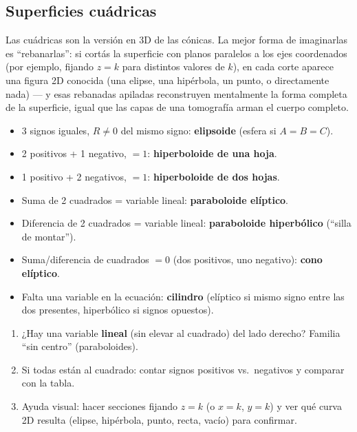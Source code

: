 \documentclass[11pt,a4paper]{article}
\begin{document}
\subsection{Superficies cuádricas}

\begin{intuicion}
Las cuádricas son la versión en 3D de las cónicas. La mejor forma de imaginarlas es
``rebanarlas'': si cortás la superficie con planos paralelos a los ejes coordenados (por
ejemplo, fijando $z=k$ para distintos valores de $k$), en cada corte aparece una figura
2D conocida (una elipse, una hipérbola, un punto, o directamente nada) — y esas rebanadas
apiladas reconstruyen mentalmente la forma completa de la superficie, igual que las capas
de una tomografía arman el cuerpo completo.
\end{intuicion}

\begin{teoria}[Reconocimiento por signos, forma $Ax^2+By^2+Cz^2=R$ o variable lineal]
\begin{itemize}
    \item 3 signos iguales, $R\neq0$ del mismo signo: \textbf{elipsoide} (esfera si
    $A=B=C$).
    \item 2 positivos + 1 negativo, $=1$: \textbf{hiperboloide de una hoja}.
    \item 1 positivo + 2 negativos, $=1$: \textbf{hiperboloide de dos hojas}.
    \item Suma de 2 cuadrados = variable lineal: \textbf{paraboloide elíptico}.
    \item Diferencia de 2 cuadrados = variable lineal: \textbf{paraboloide hiperbólico}
    (``silla de montar'').
    \item Suma/diferencia de cuadrados $=0$ (dos positivos, uno negativo):
    \textbf{cono elíptico}.
    \item Falta una variable en la ecuación: \textbf{cilindro} (elíptico si mismo signo
    entre las dos presentes, hiperbólico si signos opuestos).
\end{itemize}
\end{teoria}

\begin{proc}
\begin{enumerate}
    \item ¿Hay una variable \textbf{lineal} (sin elevar al cuadrado) del lado derecho?
    Familia ``sin centro'' (paraboloides).
    \item Si todas están al cuadrado: contar signos positivos vs.\ negativos y comparar
    con la tabla.
    \item Ayuda visual: hacer secciones fijando $z=k$ (o $x=k$, $y=k$) y ver qué curva 2D
    resulta (elipse, hipérbola, punto, recta, vacío) para confirmar.
\end{enumerate}
\end{proc}
\end{document}
